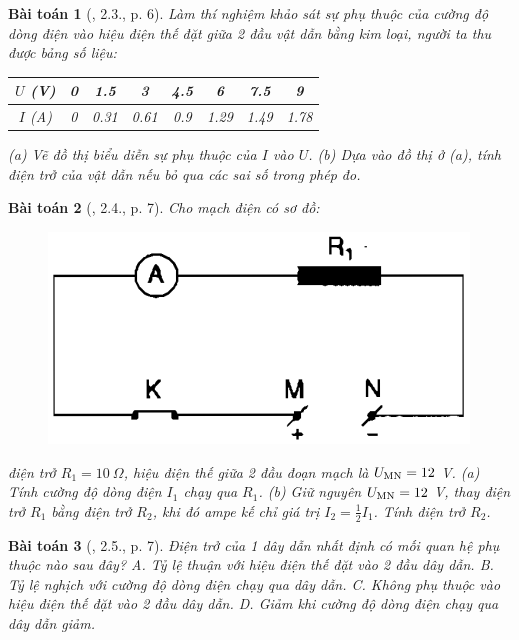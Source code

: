 \documentclass{article}
\newtheorem{baitoan}{Bài toán}
\begin{document}
\begin{baitoan}[\cite{SBT_Vat_Ly_9}, 2.3., p. 6]
	Làm thí nghiệm khảo sát sự phụ thuộc của cường độ dòng điện vào hiệu điện thế đặt giữa 2 đầu vật dẫn bằng kim loại, người ta thu được bảng số liệu:
	\begin{table}[H]
		\centering
		\begin{tabular}{|c|c|c|c|c|c|c|c|}
			\hline
			$U$ (V) & 0 & 1.5 & 3 & 4.5 & 6 & 7.5 & 9 \\
			\hline
			$I$ (A) & 0 & 0.31 & 0.61 & 0.9 & 1.29 & 1.49 & 1.78 \\
			\hline
		\end{tabular}
	\end{table}
	\noindent(a) Vẽ đồ thị biểu diễn sự phụ thuộc của $I$ vào $U$. (b) Dựa vào đồ thị ở (a), tính điện trở của vật dẫn nếu bỏ qua các sai số trong phép đo.
\end{baitoan}

\begin{baitoan}[\cite{SBT_Vat_Ly_9}, 2.4., p. 7]
	Cho mạch điện có sơ đồ:
	\begin{figure}[H]
		\centering
		\includegraphics[scale=0.3]{SBT_2.2}
	\end{figure}
	\noindent điện trở $R_1 = 10\ \Omega$, hiệu điện thế giữa 2 đầu đoạn mạch là $U_{\rm MN} = 12$ \emph{V}. (a) Tính cường độ dòng điện $I_1$ chạy qua $R_1$. (b) Giữ nguyên $U_{\rm MN} = 12$ \emph{V}, thay điện trở $R_1$ bằng điện trở $R_2$, khi đó ampe kế chỉ giá trị $I_2 = \frac{1}{2}I_1$. Tính điện trở $R_2$.
\end{baitoan}

\begin{baitoan}[\cite{SBT_Vat_Ly_9}, 2.5., p. 7]
	Điện trở của 1 dây dẫn nhất định có mối quan hệ phụ thuộc nào sau đây? {\sf A.} Tỷ lệ thuận với hiệu điện thế đặt vào 2 đầu dây dẫn. {\sf B.} Tỷ lệ nghịch với cường độ dòng điện chạy qua dây dẫn. {\sf C.} Không phụ thuộc vào hiệu điện thế đặt vào 2 đầu dây dẫn. {\sf D.} Giảm khi cường độ dòng điện chạy qua dây dẫn giảm.
\end{baitoan}
\end{document}
